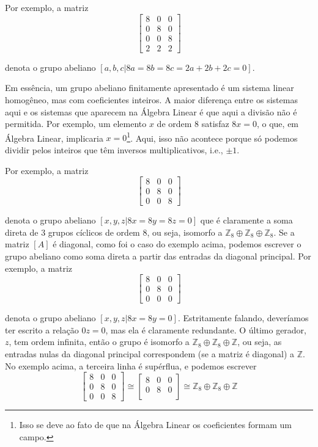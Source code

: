 	\par\vspace{0.3cm} Por exemplo, a matriz 
	$$ \begin{bmatrix}
	8 & 0 & 0 \\
	0 & 8 & 0 \\
	0 & 0 & 8 \\
	2 & 2 & 2
	\end{bmatrix} $$
	\par\vspace{0.3cm} denota o grupo abeliano $[ a,b,c \vert 8a=8b=8c=2a+2b+2c=0 ]$.
	\par\vspace{0.3cm} Em essência, um grupo abeliano finitamente apresentado é um sistema linear homogêneo, mas com coeficientes inteiros. A maior diferença entre os sistemas aqui e os sistemas que aparecem na Álgebra Linear é que aqui a divisão não é permitida. Por exemplo, um elemento $x$ de ordem $8$ satisfaz $8x=0$, o que, em Álgebra Linear, implicaria $x=0$\footnote{Isso se deve ao fato de que na Álgebra Linear os coeficientes formam um campo.}. Aqui, isso não acontece porque só podemos dividir pelos inteiros que têm inversos multiplicativos, i.e., $\pm1$.
	\par\vspace{0.3cm} Por exemplo, a matriz 
	$$ \begin{bmatrix}
	8 & 0 & 0 \\
	0 & 8 & 0 \\
	0 & 0 & 8 
	\end{bmatrix} $$
	\par\vspace{0.3cm} denota o grupo abeliano $[x,y,z\vert 8x=8y=8z=0]$ que é claramente a soma direta de $3$ grupos cíclicos de ordem $8$, ou seja, isomorfo a $\mathbb{Z}_8\oplus\mathbb{Z}_8\oplus\mathbb{Z}_8$. Se a matriz $[A]$ é diagonal, como foi o caso do exemplo acima, podemos escrever o grupo abeliano como soma direta a partir das entradas da diagonal principal. Por exemplo, a matriz
	$$ \begin{bmatrix}
	8 & 0 & 0 \\
	0 & 8 & 0 \\
	0 & 0 & 0 
	\end{bmatrix} $$
	\par\vspace{0.3cm} denota o grupo abeliano $[x,y,z \vert 8x=8y=0]$. Estritamente falando, deveríamos ter escrito a relação $0z=0$, mas ela é claramente redundante. O último gerador, $z$, tem ordem infinita, então o grupo é isomorfo a $\mathbb{Z}_8\oplus\mathbb{Z}_8\oplus\mathbb{Z}$, ou seja, as entradas nulas da diagonal principal correspondem (se a matriz é diagonal) a $\mathbb{Z}$. No exemplo acima, a terceira linha é supérflua, e podemos escrever
	$$ \begin{bmatrix}
	8 & 0 & 0 \\
	0 & 8 & 0 \\
	0 & 0 & 8 
	\end{bmatrix}\cong \begin{bmatrix}
	8 & 0 & 0 \\
	0 & 8 & 0 \\ 
	\end{bmatrix} \cong \mathbb{Z}_8\oplus\mathbb{Z}_8\oplus\mathbb{Z} $$
